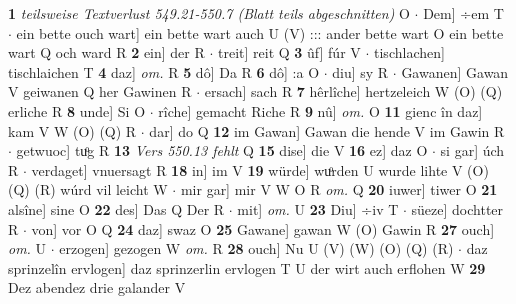 \documentclass[8pt,a4paper,notitlepage]{article}
\begin{document}
\begin{table}[ht]
\begin{minipage}[t]{0.5\linewidth}
\textbf{1} \textit{teilsweise Textverlust 549.21-550.7 (Blatt teils abgeschnitten)} O   $\cdot$ Dem] ÷em T  $\cdot$ ein bette ouch wart] ein bette wart auch U (V) ::: ander bette wart O ein bette wart Q och ward R \textbf{2} ein] der R  $\cdot$ treit] reit Q \textbf{3} ûf] fúr V  $\cdot$ tischlachen] tischlaichen T \textbf{4} daz] \textit{om.} R \textbf{5} dô] Da R \textbf{6} dô] :a O  $\cdot$ diu] sy R  $\cdot$ Gawanen] Gawan V geiwanen Q her Gawinen R  $\cdot$ ersach] sach R \textbf{7} hêrlîche] hertzeleich W (O) (Q) erliche R \textbf{8} unde] Si O  $\cdot$ rîche] gemacht Riche R \textbf{9} nû] \textit{om.} O \textbf{11} gienc în daz] kam V W (O) (Q) R  $\cdot$ dar] do Q \textbf{12} im Gawan] Gawan die hende V im Gawin R  $\cdot$ getwuoc] tuͦg R \textbf{13} \textit{Vers 550.13 fehlt} Q  \textbf{15} dise] die V \textbf{16} ez] daz O  $\cdot$ si gar] úch R  $\cdot$ verdaget] vnuersagt R \textbf{18} in] im V \textbf{19} würde] wuͦrden U wurde lihte V (O) (Q) (R) wúrd vil leicht W  $\cdot$ mir gar] mir V W O R \textit{om.} Q \textbf{20} iuwer] tiwer O \textbf{21} alsîne] sine O \textbf{22} des] Das Q Der R  $\cdot$ mit] \textit{om.} U \textbf{23} Diu] ÷iv T  $\cdot$ süeze] dochtter R  $\cdot$ von] vor O Q \textbf{24} daz] swaz O \textbf{25} Gawane] gawan W (O) Gawin R \textbf{27} ouch] \textit{om.} U  $\cdot$ erzogen] gezogen W \textit{om.} R \textbf{28} ouch] Nu U (V) (W) (O) (Q) (R)  $\cdot$ daz sprinzelîn ervlogen] daz sprinzerlin ervlogen T U der wirt auch erflohen W \textbf{29} Dez abendez drie galander V \newline
\end{minipage}
\end{table}
\end{document}
